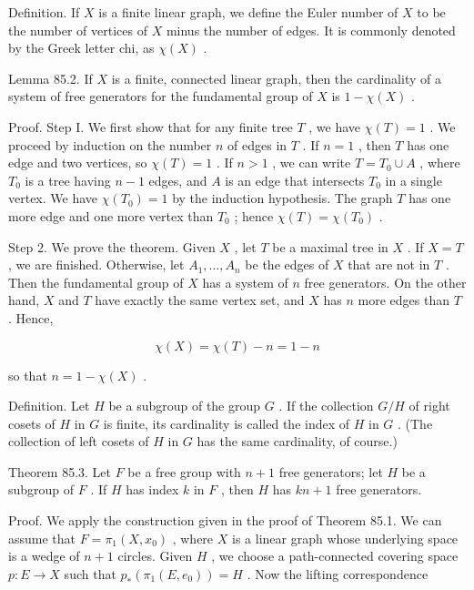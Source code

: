 Definition. If \(X\) is a finite linear graph, we define the Euler number of \(X\) to be the number of vertices of \(X\) minus the number of edges. It is commonly denoted by the Greek letter chi, as \(\chi \left( X\right)\) .

Lemma 85.2. If \(X\) is a finite, connected linear graph, then the cardinality of a system of free generators for the fundamental group of \(X\) is \(1 - \chi \left( X\right)\) .

Proof. Step I. We first show that for any finite tree \(T\) , we have \(\chi \left( T\right)  = 1\) . We proceed by induction on the number \(n\) of edges in \(T\) . If \(n = 1\) , then \(T\) has one edge and two vertices, so \(\chi \left( T\right)  = 1\) . If \(n > 1\) , we can write \(T = {T}_{0} \cup  A\) , where \({T}_{0}\) is a tree having \(n - 1\) edges, and \(A\) is an edge that intersects \({T}_{0}\) in a single vertex. We have \(\chi \left( {T}_{0}\right)  = 1\) by the induction hypothesis. The graph \(T\) has one more edge and one more vertex than \({T}_{0}\) ; hence \(\chi \left( T\right)  = \chi \left( {T}_{0}\right)\) .

Step 2. We prove the theorem. Given \(X\) , let \(T\) be a maximal tree in \(X\) . If \(X = T\) , we are finished. Otherwise, let \({A}_{1},\ldots ,{A}_{n}\) be the edges of \(X\) that are not in \(T\) . Then the fundamental group of \(X\) has a system of \(n\) free generators. On the other hand, \(X\) and \(T\) have exactly the same vertex set, and \(X\) has \(n\) more edges than \(T\) . Hence,

\[
\chi \left( X\right)  = \chi \left( T\right)  - n = 1 - n
\]

so that \(n = 1 - \chi \left( X\right)\) .

Definition. Let \(H\) be a subgroup of the group \(G\) . If the collection \(G/H\) of right cosets of \(H\) in \(G\) is finite, its cardinality is called the index of \(H\) in \(G\) . (The collection of left cosets of \(H\) in \(G\) has the same cardinality, of course.)

Theorem 85.3. Let \(F\) be a free group with \(n + 1\) free generators; let \(H\) be a subgroup of \(F\) . If \(H\) has index \(k\) in \(F\) , then \(H\) has \({kn} + 1\) free generators.

Proof. We apply the construction given in the proof of Theorem 85.1. We can assume that \(F = {\pi }_{1}\left( {X,{x}_{0}}\right)\) , where \(X\) is a linear graph whose underlying space is a wedge of \(n + 1\) circles. Given \(H\) , we choose a path-connected covering space \(p : E \rightarrow  X\) such that \({p}_{ * }\left( {{\pi }_{1}\left( {E,{e}_{0}}\right) }\right)  = H\) . Now the lifting correspondence

